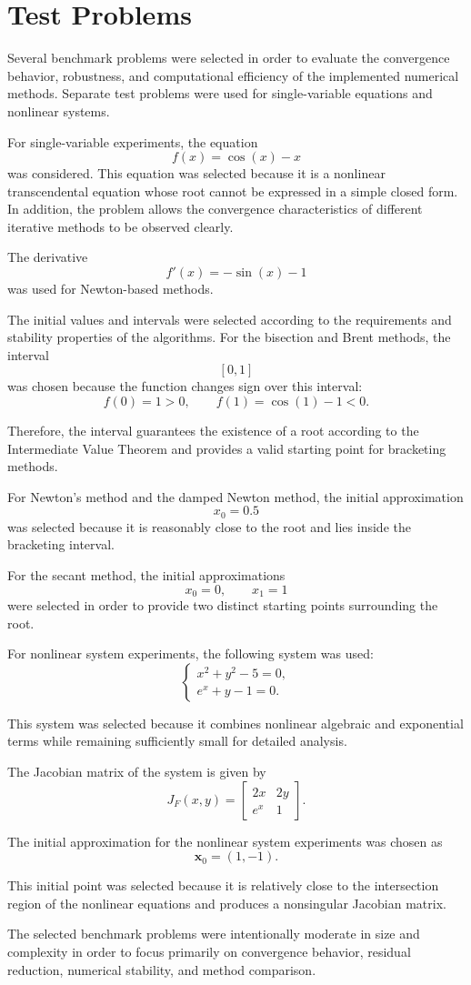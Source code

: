 \section{Test Problems}

Several benchmark problems were selected in order to evaluate the convergence behavior, robustness, and computational efficiency of the implemented numerical methods. Separate test problems were used for single-variable equations and nonlinear systems.

For single-variable experiments, the equation
\[
f(x)=\cos(x)-x
\]
was considered. This equation was selected because it is a nonlinear transcendental equation whose root cannot be expressed in a simple closed form. In addition, the problem allows the convergence characteristics of different iterative methods to be observed clearly.

The derivative
\[
f'(x)=-\sin(x)-1
\]
was used for Newton-based methods.

The initial values and intervals were selected according to the requirements and stability properties of the algorithms. For the bisection and Brent methods, the interval
\[
[0,1]
\]
was chosen because the function changes sign over this interval:
\[
f(0)=1>0,
\qquad
f(1)=\cos(1)-1<0.
\]

Therefore, the interval guarantees the existence of a root according to the Intermediate Value Theorem and provides a valid starting point for bracketing methods.

For Newton's method and the damped Newton method, the initial approximation
\[
x_0=0.5
\]
was selected because it is reasonably close to the root and lies inside the bracketing interval.

For the secant method, the initial approximations
\[
x_0=0,
\qquad
x_1=1
\]
were selected in order to provide two distinct starting points surrounding the root.

For nonlinear system experiments, the following system was used:
\[
\begin{cases}
x^2+y^2-5=0, \\
e^x+y-1=0.
\end{cases}
\]

This system was selected because it combines nonlinear algebraic and exponential terms while remaining sufficiently small for detailed analysis.

The Jacobian matrix of the system is given by
\[
J_F(x,y)=
\begin{bmatrix}
2x & 2y \\
e^x & 1
\end{bmatrix}.
\]

The initial approximation for the nonlinear system experiments was chosen as
\[
\mathbf{x}_0=(1,-1).
\]

This initial point was selected because it is relatively close to the intersection region of the nonlinear equations and produces a nonsingular Jacobian matrix.

The selected benchmark problems were intentionally moderate in size and complexity in order to focus primarily on convergence behavior, residual reduction, numerical stability, and method comparison.